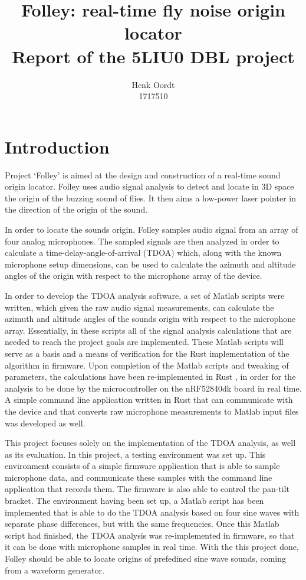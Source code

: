 \documentclass[a4paper]{article}
\begin{document}
\title{{Folley: real-time fly noise origin locator} \\\large {Report of the 5LIU0 DBL project}}
\author{{Henk Oordt} \hfill
\\
{1717510} \hfill}

\maketitle
\section{Introduction}
Project `Folley' is aimed at the design and construction of a real-time sound origin locator. Folley uses audio signal analysis to detect and locate in 3D space the origin of the buzzing sound of flies. It then aims a low-power laser pointer in the direction of the origin of the sound.

In order to locate the sounds origin, Folley samples audio signal from an array of four analog microphones. The sampled signals are then analyzed in order to calculate a time-delay-angle-of-arrival (TDOA) \cite{6327613} which, along with the known microphone setup dimensions, can be used to calculate the azimuth and altitude angles of the origin with respect to the microphone array of the device.

In order to develop the TDOA analysis software, a set of Matlab \cite{matlab} scripts were written, which given the raw audio signal measurements, can calculate the azimuth and altitude angles of the sounds origin with respect to the microphone array. Essentially, in these scripts all of the signal analysis calculations that are needed to reach the project goals are implemented. These Matlab scripts will serve as a basis and a means of verification for the Rust implementation of the algorithm in firmware. Upon completion of the Matlab scripts and tweaking of parameters, the calculations have been re-implemented in Rust \cite{rust}, in order for the analysis to be done by the microcontroller on the nRF52840dk \cite{nrf52840-dk} board in real time. A simple command line application written in Rust that can communicate with the device and that converts raw microphone measurements to Matlab input files was developed as well.

This project focuses solely on the implementation of the TDOA analysis, as well as its evaluation. In this project, a testing environment was set up. This environment consists of a simple firmware application that is able to sample microphone data, and communicate these samples with the command line application that records them. The firmware is also able to control the pan-tilt bracket. The environment having been set up, a Matlab script has been implemented that is able to do the TDOA analysis based on four sine waves with separate phase differences, but with the same frequencies. Once this Matlab script had finished, the TDOA analysis was re-implemented in firmware, so that it can be done with microphone samples in real time. With the this project done, Folley should be able to locate origins of prefedined sine wave sounds, coming from a waveform generator.
\end{document}
